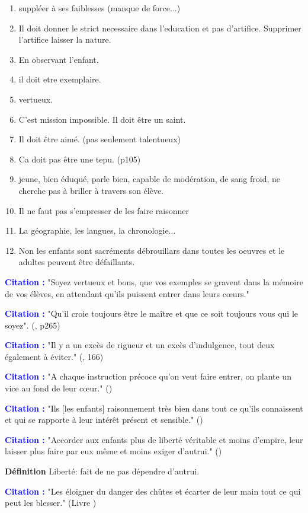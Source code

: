 \documentclass[a4paper, 11pt, hidelinks]{article}
\newcommand{\de}{\large \textbf{Définition} \large }
\newcommand{\cit}{\large \textcolor{blue}{\textbf{Citation :}} \large }
\newcommand{\rb}[1]{\Romanbar{#1}}
\begin{document}
\begin{enumerate}
    \item suppléer à ses faiblesses (manque de force...)
    \item Il doit donner le strict necessaire dans l'education et pas d'artifice. Supprimer l'artifice laisser la nature. 
    \item En observant l'enfant.
    \item il doit etre exemplaire.
    \item vertueux.
    \item C'est mission impossible. Il doit être un saint.
    \item Il doit être aimé. (pas seulement talentueux)
    \item Ca doit pas être une tepu. (p105)
    \item jeune, bien éduqué, parle bien, capable de modération, de sang froid, ne cherche pas à briller à travers son élève.
    \item Il ne faut pas s'empresser de les faire raisonner
    \item La géographie, les langues, la chronologie...
    \item Non les enfants sont sacréments débrouillars dans toutes les oeuvres et le adultes peuvent être défaillants.
\end{enumerate}


\cit "Soyez vertueux et bons, que vos exemples se gravent dans la mémoire de vos élèves, en attendant qu'ils puissent
entrer dans leurs c\oe urs."

\cit "Qu'il croie toujours être le maître et que ce soit toujours vous qui le soyez". (\rb{2}, p265)


\cit "Il y a un excès de rigueur et un excès d'indulgence, tout deux également à éviter." (\rb{2}, 166)


\cit "A chaque instruction précoce qu'on veut faire entrer, on plante un vice au fond de leur c\oe ur." (\rb{2})


\cit "Ils [les enfants] raisonnement très bien dans tout ce qu'ils connaissent et qui se rapporte à leur intérêt présent et sensible." (\rb{2})


\cit "Accorder aux enfants plus de liberté véritable et moins d'empire, leur laisser plus faire par eux même et moins exiger d'autrui." (\rb{1})


\de Liberté: fait de ne pas dépendre d'autrui.


\cit "Les éloigner du danger des chûtes et écarter de leur main tout ce qui peut les blesser." (Livre \rb{1})
\end{document}

